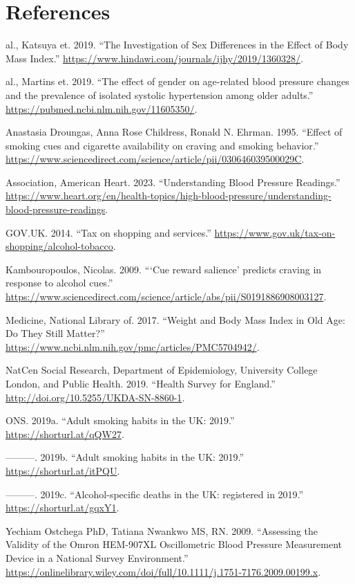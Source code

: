 \documentclass[
  11pt,
  twocolumn]{article}
\newlength{\cslhangindent}
\newenvironment{CSLReferences}[2] %
 {\begin{list}{}{%
  \setlength{\itemindent}{0pt}
  \setlength{\leftmargin}{0pt}
  \setlength{\parsep}{0pt}
  \ifodd #1
   \setlength{\leftmargin}{\cslhangindent}
   \setlength{\itemindent}{-1\cslhangindent}
  \fi
  \setlength{\itemsep}{#2\baselineskip}}}
 {\end{list}}
\begin{document}
\section*{References}\label{references}

\label{refs}
\begin{CSLReferences}{1}{0}
al., Katsuya et. 2019. {``{The Investigation of Sex Differences in the
Effect of Body Mass Index}.''}
\url{https://www.hindawi.com/journals/ijhy/2019/1360328/}.

al., Martins et. 2019. {``{The effect of gender on age-related blood
pressure changes and the prevalence of isolated systolic hypertension
among older adults}.''} \url{https://pubmed.ncbi.nlm.nih.gov/11605350/}.

Anastasia Droungas, Anna Rose Childress, Ronald N. Ehrman. 1995.
{``{Effect of smoking cues and cigarette availability on craving and
smoking behavior}.''}
\url{https://www.sciencedirect.com/science/article/pii/030646039500029C}.

Association, American Heart. 2023. {``{Understanding Blood Pressure
Readings}.''}
\url{https://www.heart.org/en/health-topics/high-blood-pressure/understanding-blood-pressure-readings}.

GOV.UK. 2014. {``{Tax on shopping and services}.''}
\url{https://www.gov.uk/tax-on-shopping/alcohol-tobacco}.

Kambouropoulos, Nicolas. 2009. {``{{`Cue reward salience'} predicts
craving in response to alcohol cues}.''}
\url{https://www.sciencedirect.com/science/article/abs/pii/S0191886908003127}.

Medicine, National Library of. 2017. {``{Weight and Body Mass Index in
Old Age: Do They Still Matter?}''}
\url{https://www.ncbi.nlm.nih.gov/pmc/articles/PMC5704942/}.

NatCen Social Research, Department of Epidemiology, University College
London, and Public Health. 2019. {``{Health Survey for England}.''}
\url{http://doi.org/10.5255/UKDA-SN-8860-1}.

ONS. 2019a. {``{Adult smoking habits in the UK: 2019}.''}
\url{https://shorturl.at/qQW27}.

---------. 2019b. {``{Adult smoking habits in the UK: 2019}.''}
\url{https://shorturl.at/itPQU}.

---------. 2019c. {``{Alcohol-specific deaths in the UK: registered in
2019}.''} \url{https://shorturl.at/gqxY1}.

Yechiam Ostchega PhD, Tatiana Nwankwo MS, RN. 2009. {``{Assessing the
Validity of the Omron HEM-907XL Oscillometric Blood Pressure Measurement
Device in a National Survey Environment}.''}
\url{https://onlinelibrary.wiley.com/doi/full/10.1111/j.1751-7176.2009.00199.x}.

\end{CSLReferences}
\end{document}
